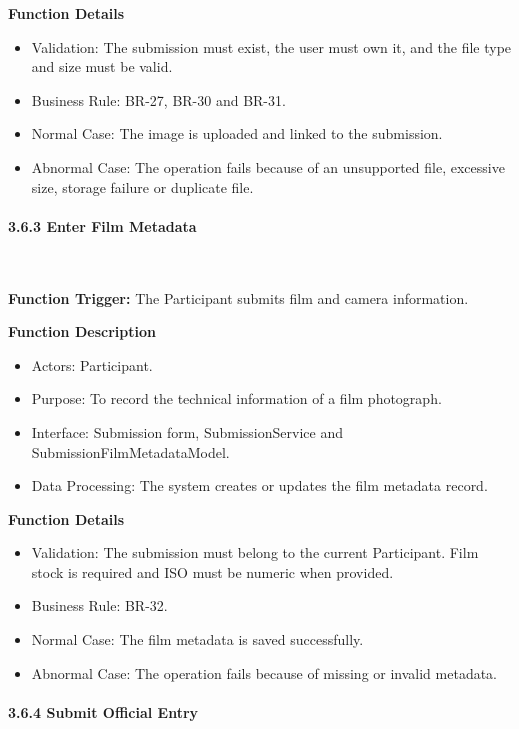 \textbf{Function Details}
\begin{itemize}[leftmargin=1.5em, nosep]
    \item Validation: The submission must exist, the user must own it, and the file type and size must be valid.
    \item Business Rule: BR-27, BR-30 and BR-31.
    \item Normal Case: The image is uploaded and linked to the submission.
    \item Abnormal Case: The operation fails because of an unsupported file, excessive size, storage failure or duplicate file.
\end{itemize}

\paragraph*{3.6.3 Enter Film Metadata}\leavevmode\\[-0.5em]
\label{par:enter-film-metadata}

\textbf{Function Trigger:} The Participant submits film and camera information.

\textbf{Function Description}
\begin{itemize}[leftmargin=1.5em, nosep]
    \item Actors: Participant.
    \item Purpose: To record the technical information of a film photograph.
    \item Interface: Submission form, SubmissionService and SubmissionFilmMetadataModel.
    \item Data Processing: The system creates or updates the film metadata record.
\end{itemize}

\textbf{Function Details}
\begin{itemize}[leftmargin=1.5em, nosep]
    \item Validation: The submission must belong to the current Participant. Film stock is required and ISO must be numeric when provided.
    \item Business Rule: BR-32.
    \item Normal Case: The film metadata is saved successfully.
    \item Abnormal Case: The operation fails because of missing or invalid metadata.
\end{itemize}

\paragraph*{3.6.4 Submit Official Entry}\leavevmode\\[-0.5em]
\label{par:submit-official-entry}

